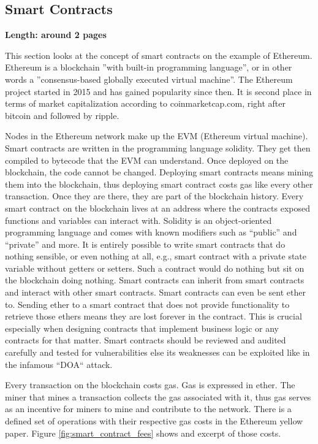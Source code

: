\subsection{Smart Contracts}
\label{subsec:02_smart_contracts}

\textbf{Length: around 2 pages}

This section looks at the concept of smart contracts on the example of Ethereum.
Ethereum is a blockchain ''with built-in programming language'', or in other words a ''consensus-based globally executed virtual machine''.
The Ethereum project started in 2015 and has gained popularity since then. It is second place in terms of market capitalization according to coinmarketcap.com, right after bitcoin and followed by ripple.

Nodes in the Ethereum network make up the EVM (Ethereum virtual machine). Smart contracts are written in the programming language solidity. They get then compiled to bytecode that the EVM can understand.
Once deployed on the blockchain, the code cannot be changed. Deploying smart contracts means mining them into the blockchain, thus deploying smart contract costs gas like every other transaction. Once they are there, they are part of the blockchain history.
Every smart contract on the blockchain lives at an address where the contracts exposed functions and variables can interact with. Solidity is an object-oriented programming language and comes with known modifiers such as ``public'' and ``private'' and more.
It is entirely possible to write smart contracts that do nothing sensible, or even nothing at all, e.g., smart contract with a private state variable without getters or setters.
Such a contract would do nothing but sit on the blockchain doing nothing. Smart contracts can inherit from smart contracts and interact with other smart contracts.
Smart contracts can even be sent ether to. Sending ether to a smart contract that does not provide functionality to retrieve those ethers means they are lost forever in the contract.
This is crucial especially when designing contracts that implement business logic or any contracts for that matter. Smart contracts should be reviewed and audited carefully and tested for vulnerabilities else its weaknesses can be exploited like in the infamous ``DOA`` attack.

Every transaction on the blockchain costs gas. Gas is expressed in ether. The miner that mines a transaction collects the gas associated with it, thus gas serves as an incentive for miners to mine and contribute to the network. There is a defined set of operations with their respective gas costs in the Ethereum yellow paper.
Figure \ref{fig:smart_contract_fees} shows and excerpt of those costs.

